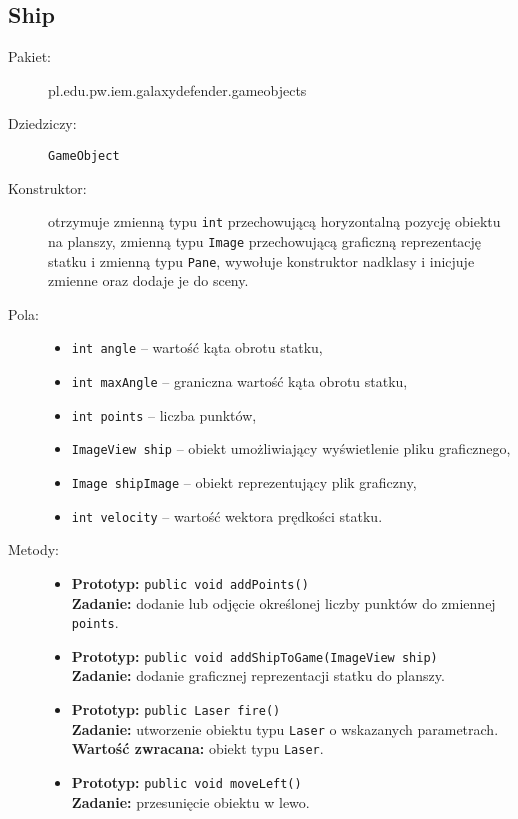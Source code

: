 \documentclass[a4paper]{article}
\newcommand{\prog}{\texttt}
\begin{document}
\subsection{Ship}
\begin{description}
    \item[Pakiet:] pl.edu.pw.iem.galaxydefender.gameobjects
    \item[Dziedziczy:] \prog{GameObject}
    \item[Konstruktor:] otrzymuje zmienną typu \prog{int} przechowującą horyzontalną pozycję obiektu na planszy, zmienną typu \prog{Image} przechowującą graficzną reprezentację statku i zmienną typu \prog{Pane}, wywołuje konstruktor nadklasy i inicjuje zmienne oraz dodaje je do sceny.
    \item[Pola:] \hfill
    \begin{itemize}
        \item \prog{int angle} -- wartość kąta obrotu statku,
        \item \prog{int maxAngle} -- graniczna wartość kąta obrotu statku,
        \item \prog{int points} -- liczba punktów,
        \item \prog{ImageView ship} -- obiekt umożliwiający wyświetlenie pliku graficznego,
        \item \prog{Image shipImage} -- obiekt reprezentujący plik graficzny,
        \item \prog{int velocity} -- wartość wektora prędkości statku.
    \end{itemize}
    \item[Metody:] \hfill
    \begin{itemize}
        \item \textbf{Prototyp:} \prog{public void addPoints()}\\\textbf{Zadanie:} dodanie lub odjęcie określonej liczby punktów do zmiennej \prog{points}.
        \item \textbf{Prototyp:} \prog{public void addShipToGame(ImageView ship)}\\\textbf{Zadanie:} dodanie graficznej reprezentacji statku do planszy.
        \item \textbf{Prototyp:} \prog{public Laser fire()}\\\textbf{Zadanie:} utworzenie obiektu typu \prog{Laser} o wskazanych parametrach.\\\textbf{Wartość zwracana:} obiekt typu \prog{Laser}.
        \item \textbf{Prototyp:} \prog{public void moveLeft()}\\\textbf{Zadanie:} przesunięcie obiektu w lewo.

\end{itemize}
\end{description}
\end{document}
